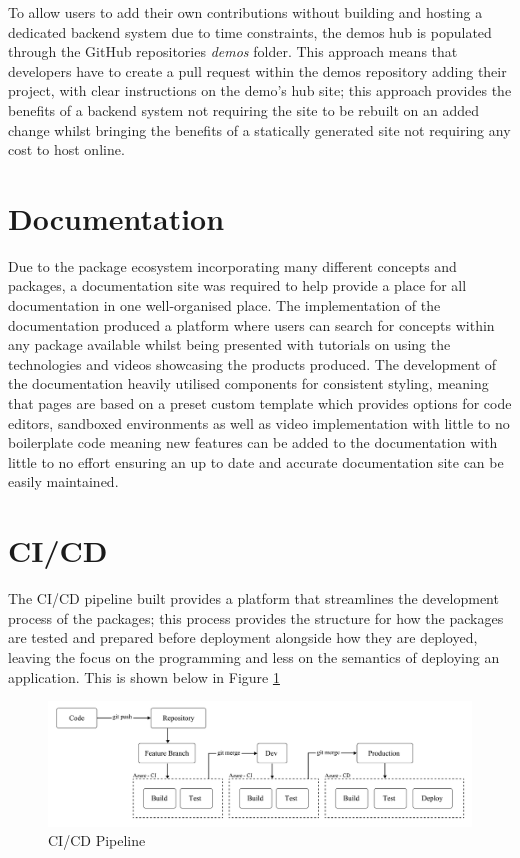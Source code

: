 \documentclass{l4proj}
\begin{document}
To allow users to add their own contributions without building and hosting a dedicated backend system due to time constraints, the demos hub is populated through the GitHub repositories \textit{demos} folder. This approach means that developers have to create a pull request within the demos repository adding their project, with clear instructions on the demo's hub site; this approach provides the benefits of a backend system not requiring the site to be rebuilt on an added change whilst bringing the benefits of a statically generated site not requiring any cost to host online.

\section{Documentation}
Due to the package ecosystem incorporating many different concepts and packages, a documentation site was required to help provide a place for all documentation in one well-organised place. The implementation of the documentation produced a platform where users can search for concepts within any package available whilst being presented with tutorials on using the technologies and videos showcasing the products produced. The development of the documentation heavily utilised components for consistent styling, meaning that pages are based on a preset custom template which provides options for code editors, sandboxed environments as well as video implementation with little to no boilerplate code meaning new features can be added to the documentation with little to no effort ensuring an up to date and accurate documentation site can be easily maintained.

\section{CI/CD}
The CI/CD pipeline built provides a platform that streamlines the development process of the packages; this process provides the structure for how the packages are tested and prepared before deployment alongside how they are deployed, leaving the focus on the programming and less on the semantics of deploying an application. This is shown below in Figure \ref{fig:CICDPipeline}

\begin{figure}[!ht]
    \begin{center}
        
    
    \includegraphics[width=14cm]{dissertation/images/CICD-structure.png}
    \end{center}
    \caption{CI/CD Pipeline}
    \label{fig:CICDPipeline}
\end{figure}
\end{document}
